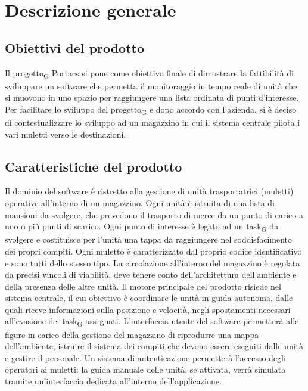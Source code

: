 \section{Descrizione generale}

\subsection{Obiettivi del prodotto}
Il \gls{progetto}\textsubscript{G} Portacs si pone come obiettivo finale di dimostrare la fattibilità di sviluppare un software che permetta il monitoraggio in tempo reale di unità che si muovono in uno spazio per raggiungere una lista ordinata di punti d’interesse. Per facilitare lo sviluppo del \gls{progetto}\textsubscript{G} e dopo accordo con l'azienda, si è deciso di contestualizzare lo sviluppo ad un magazzino in cui il sistema centrale pilota i vari muletti verso le destinazioni.

\subsection{Caratteristiche del prodotto}
Il dominio del software è ristretto alla gestione di unità trasportatrici (muletti) operative all’interno di un magazzino. Ogni unità è istruita di una lista di mansioni da svolgere, che prevedono il trasporto di merce da un punto di carico a uno o più punti di scarico. Ogni punto di interesse è legato ad un \gls{task}\textsubscript{G} da svolgere e costituisce per l’unità una tappa da raggiungere nel soddisfacimento dei propri compiti. Ogni muletto è caratterizzato dal proprio codice identificativo e sono tutti dello stesso tipo.
La circolazione all’interno del magazzino è regolata da precisi vincoli di viabilità, deve tenere conto dell’architettura dell’ambiente e della presenza delle altre unità. 
Il motore principale del prodotto risiede nel sistema centrale, il cui obiettivo è coordinare le unità in guida autonoma, dalle quali riceve informazioni sulla posizione e velocità, negli spostamenti necessari all’evasione dei \gls{task}\textsubscript{G} assegnati. L’interfaccia utente del software permetterà alle figure in carico della gestione del magazzino di riprodurre una mappa dell’ambiente, istruire il sistema dei compiti che devono essere eseguiti dalle unità e gestire il personale. Un sistema di autenticazione permetterà l’accesso degli operatori ai muletti: la guida manuale delle unità, se attivata, verrà simulata tramite un’interfaccia dedicata all’interno dell’applicazione.


